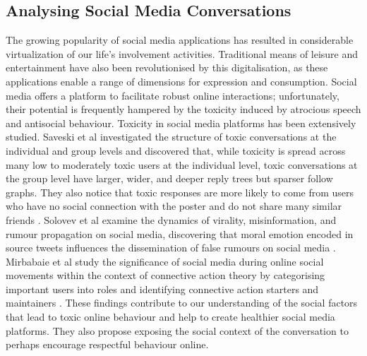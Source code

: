 \documentclass[acmtog]{acmart}
\begin{document}

\subsection{Analysing Social Media Conversations}
The growing popularity of social media applications has resulted in considerable virtualization of our life's involvement activities. Traditional means of leisure and entertainment have also been revolutionised by this digitalisation, as these applications enable a range of dimensions for expression and consumption. Social media offers a platform to facilitate robust online interactions; unfortunately, their potential is frequently hampered by the toxicity induced by atrocious speech and antisocial behaviour. Toxicity in social media platforms has been extensively studied. Saveski et al investigated the structure of toxic conversations at the individual and group levels and discovered that, while toxicity is spread across many low to moderately toxic users at the individual level, toxic conversations at the group level have larger, wider, and deeper reply trees but sparser follow graphs. They also notice that toxic responses are more likely to come from users who have no social connection with the poster and do not share many similar friends \cite{saveski2021structure}. Solovev et al examine the dynamics of virality, misinformation, and rumour propagation on social media, discovering that moral emotion encoded in source tweets influences the dissemination of false rumours on social media \cite{solovev2022moral}. Mirbabaie et al study the significance of social media during online social movements within the context of connective action theory by categorising important users into roles and identifying connective action starters and maintainers \cite{mirbabaie2021development}. These findings contribute to our understanding of the social factors that lead to toxic online behaviour and help to create healthier social media platforms. They also propose exposing the social context of the conversation to perhaps encourage respectful behaviour online.

\end{document}
